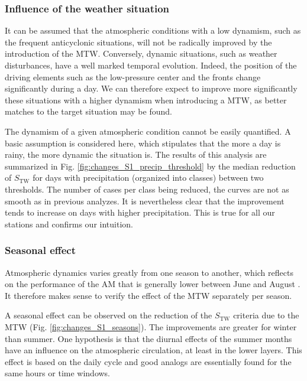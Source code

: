 \documentclass[hess, manuscript]{copernicus}
\begin{document}
\subsubsection{Influence of the weather situation}
\label{sec:influence_precip}

It can be assumed that the atmospheric conditions with a low dynamism, such as the frequent anticyclonic situations, will not be radically improved by the introduction of the MTW. Conversely, dynamic situations, such as weather disturbances, have a well marked temporal evolution. Indeed, the position of the driving elements such as the low-pressure center and the fronts change significantly during a day. We can therefore expect to improve more significantly these situations with a higher dynamism when introducing a MTW, as better matches to the target situation may be found.

The dynamism of a given atmospheric condition cannot be easily quantified. A basic assumption is considered here, which stipulates that the more a day is rainy, the more dynamic the situation is. The results of this analysis are summarized in Fig. \ref{fig:changes_S1_precip_threshold} by the median reduction of $S_{\text{TW}}$ for days with precipitation (organized into classes) between two thresholds. The number of cases per class being reduced, the curves are not as smooth as in previous analyzes. It is nevertheless clear that the improvement tends to increase on days with higher precipitation. This is true for all our stations and confirms our intuition.


\subsubsection{Seasonal effect}
\label{sec:seasonal_effect}

Atmospheric dynamics varies greatly from one season to another, which reflects on the performance of the AM that is generally lower between June and August \citep{Bliefernicht2010}. It therefore makes sense to verify the effect of the MTW separately per season.

A seasonal effect can be observed on the reduction of the $S_{\text{TW}}$ criteria due to the MTW (Fig. \ref{fig:changes_S1_seasons}). The improvements are greater for winter than summer. One hypothesis is that the diurnal effects of the summer months have an influence on the atmospheric circulation, at least in the lower layers. This effect is based on the daily cycle and good analogs are essentially found for the same hours or time windows.
\end{document}
